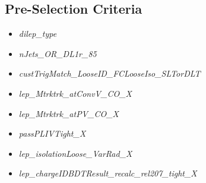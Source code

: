 \subsection{Pre-Selection Criteria}\label{preselectMissingFeatures}
    \begin{multicols}{2}
    \begin{itemize}
        \item \textit{dilep\_type}
        \item \textit{nJets\_OR\_DL1r\_85}
        \item \textit{custTrigMatch\_LooseID\_FCLooseIso\_SLTorDLT}
        \item \textit{lep\_Mtrktrk\_atConvV\_CO\_X}
        \item \textit{lep\_Mtrktrk\_atPV\_CO\_X}
        \item \textit{passPLIVTight\_X}
        \item \textit{lep\_isolationLoose\_VarRad\_X}
        \item \textit{lep\_chargeIDBDTResult\_recalc\_rel207\_tight\_X}
    \end{itemize}
    \end{multicols}

